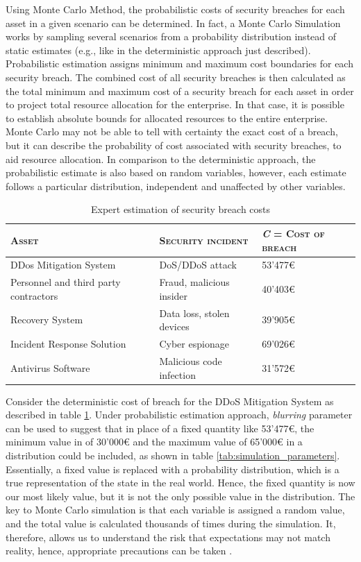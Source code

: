 Using Monte Carlo Method, the probabilistic costs of security breaches for each asset in a given scenario can be determined.
In fact, a Monte Carlo Simulation works by sampling several scenarios from a probability distribution instead of static estimates (e.g., like in the deterministic approach just described). 
Probabilistic estimation assigns minimum and maximum cost boundaries for each security breach.
The combined cost of all security breaches is then calculated as the total minimum and maximum cost of a security breach for each asset in order to project total resource allocation for the enterprise.
In that case, it is possible to establish absolute bounds for allocated resources to the entire enterprise. 
Monte Carlo may not be able to tell with certainty the exact cost of a breach, but it can describe the probability of cost associated with security breaches, to aid resource allocation. 
In comparison to the deterministic approach, the probabilistic estimate is also based on random variables, however, each estimate follows a particular distribution, independent and unaffected by other variables.

\begin{table}[H]
    \centering
    \begin{tabular}{|p{6cm}|p{5cm}|p{4cm}|}
        \hline
        \textsc{Asset} & \textsc{Security incident} & \textsc{\textit{C} = Cost of breach} \\
        \hline
        DDos Mitigation System & DoS/DDoS attack & 53'477€ \\
        \hline
        Personnel and third party contractors & Fraud, malicious insider & 40'403€ \\
        \hline
        Recovery System & Data loss, stolen devices & 39'905€ \\
        \hline
        Incident Response Solution & Cyber espionage & 69'026€ \\
        \hline
        Antivirus Software & Malicious code infection & 31'572€ \\
        \hline
    \end{tabular}
    \caption{Expert estimation of security breach costs}
    \label{tab:expert_estimation}
\end{table}

Consider the deterministic cost of breach for the DDoS Mitigation System as described in table \ref{tab:expert_estimation}.
Under probabilistic estimation approach, \textit{blurring} parameter can be used to suggest that in place of a fixed quantity like 53'477€, the minimum value in of 30'000€ and the maximum value of 65'000€ in a distribution could be included, as shown in table \ref{tab:simulation_parameters}.
Essentially, a fixed value is replaced with a probability distribution, which is a true representation of the state in the real world.
Hence, the fixed quantity is now our most likely value, but it is not the only possible value in the distribution.
The key to Monte Carlo simulation is that each variable is assigned a random value, and the total value is calculated thousands of times during the simulation.
It, therefore, allows us to understand the risk that expectations may not match reality, hence, appropriate precautions can be taken \parencite{RiskAMP}.

